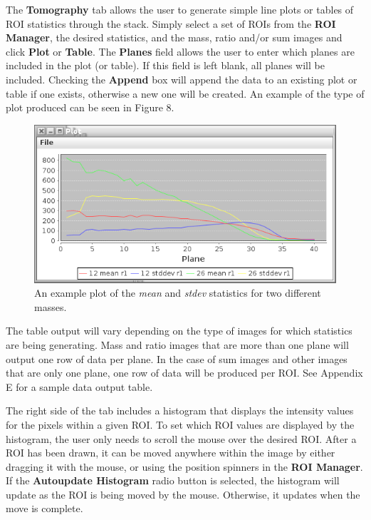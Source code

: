 \documentclass{article}
\begin{document}
	The \textbf{Tomography} tab allows the user to generate simple line plots or tables
	of ROI statistics through the stack. Simply select a set of ROIs from the 
	\textbf{ROI Manager}, the desired statistics, and the mass, ratio and/or sum  
	images and click \textbf{Plot} or \textbf{Table}.
	The \textbf{Planes} field allows the user to enter which planes are 
	included in the plot (or table). If this field is left blank, all planes will be 
	included. Checking the \textbf{Append} box will append the data to an existing
	plot or table if one exists, otherwise a new one will be created. An example of 
	the type of plot produced can be seen in Figure 8. 
	
   \begin{figure}[h!]
	\centering
	\includegraphics[scale=0.82]{snapshot_TomographyPlot2.png}
	\caption{An example plot of the \textit{mean} and \textit{stdev} statistics for two different masses.}
	\end{figure}

	The table output will vary depending on the type of images for which
	statistics are being generating. Mass and ratio images that are more
	than one plane will output one row of data per plane. In the case of
	sum images and other images that are only one plane, one row of data
	will be produced per ROI. See Appendix E for a sample data output table.
	
	The right side of the tab includes a histogram that displays the intensity values for 
	the pixels within a given ROI.
	To set which ROI values are displayed by the histogram, the user only needs to 
	scroll the mouse over the desired ROI. After a ROI has been drawn, it can be moved
	anywhere within the image by either dragging it with the mouse, or using the position
	spinners in the \textbf{ROI Manager}. If the \textbf{Autoupdate Histogram} radio 
	button is selected, the histogram will update as the ROI is being moved by the mouse.
	Otherwise, it updates when the move is complete.
\end{document}
